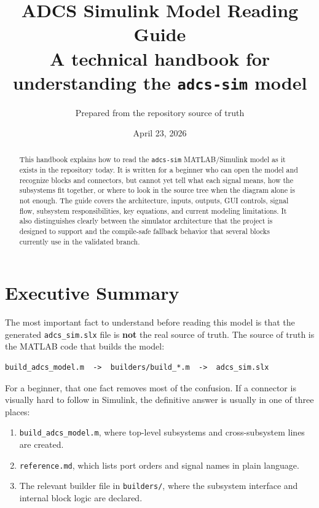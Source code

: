 \documentclass[11pt]{article}
\title{\textbf{ADCS Simulink Model Reading Guide}\\
\large A technical handbook for understanding the \texttt{adcs-sim} model}
\author{Prepared from the repository source of truth}
\date{April 23, 2026}
\begin{document}
\maketitle

\begin{abstract}
This handbook explains how to read the \texttt{adcs-sim} MATLAB/Simulink model as it exists in the repository today. It is written for a beginner who can open the model and recognize blocks and connectors, but cannot yet tell what each signal means, how the subsystems fit together, or where to look in the source tree when the diagram alone is not enough. The guide covers the architecture, inputs, outputs, GUI controls, signal flow, subsystem responsibilities, key equations, and current modeling limitations. It also distinguishes clearly between the simulator architecture that the project is designed to support and the compile-safe fallback behavior that several blocks currently use in the validated branch.
\end{abstract}

\section*{Executive Summary}

The most important fact to understand before reading this model is that the generated \texttt{adcs\_sim.slx} file is \textbf{not} the real source of truth. The source of truth is the MATLAB code that builds the model:

\begin{verbatim}
build_adcs_model.m  ->  builders/build_*.m  ->  adcs_sim.slx
\end{verbatim}

For a beginner, that one fact removes most of the confusion. If a connector is visually hard to follow in Simulink, the definitive answer is usually in one of three places:

\begin{enumerate}
\item \texttt{build\_adcs\_model.m}, where top-level subsystems and cross-subsystem lines are created.
\item \texttt{reference.md}, which lists port orders and signal names in plain language.
\item The relevant builder file in \texttt{builders/}, where the subsystem interface and internal block logic are declared.
\end{enumerate}
\end{document}
